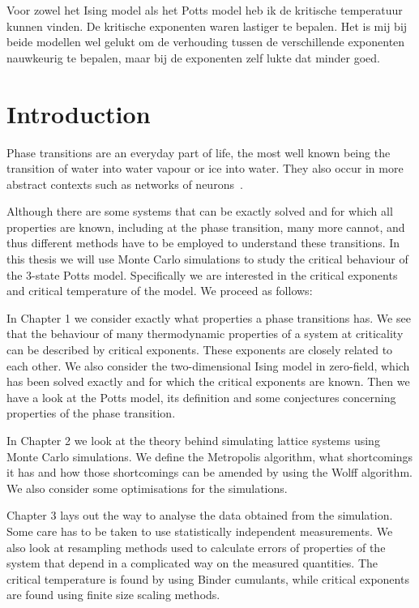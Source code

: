 \documentclass[11pt, a4paper]{report} %
\begin{document}
Voor zowel het Ising model als het Potts model heb ik de kritische temperatuur kunnen vinden.
De kritische exponenten waren lastiger te bepalen.
Het is mij bij beide modellen wel gelukt om de verhouding tussen de verschillende exponenten nauwkeurig te bepalen, maar bij de exponenten zelf lukte dat minder goed.



\tableofcontents

\chapter*{Introduction}
Phase transitions are an everyday part of life, the most well known being the transition of water into water vapour or ice into water.
They also occur in more abstract contexts such as networks of neurons~\cite{tkacik:2015}.

Although there are some systems that can be exactly solved and for which all properties are known, including at the phase transition, many more cannot, and thus different methods have to be employed to understand these transitions.
In this thesis we will use Monte Carlo simulations to study the critical behaviour of the 3-state Potts model.
Specifically we are interested in the critical exponents and critical temperature of the model.
We proceed as follows:

In Chapter 1 we consider exactly what properties a phase transitions has.
We see that the behaviour of many thermodynamic properties of a system at criticality can be described by critical exponents.
These exponents are closely related to each other.
We also consider the two-dimensional Ising model in zero-field, which has been solved exactly and for which the critical exponents are known.
Then we have a look at the Potts model, its definition and some conjectures concerning properties of the phase transition.

In Chapter 2 we look at the theory behind simulating lattice systems using Monte Carlo simulations.
We define the Metropolis algorithm, what shortcomings it has and how those shortcomings can be amended by using the Wolff algorithm.
We also consider some optimisations for the simulations.

Chapter 3 lays out the way to analyse the data obtained from the simulation.
Some care has to be taken to use statistically independent measurements.
We also look at resampling methods used to calculate errors of properties of the system that depend in a complicated way on the measured quantities.
The critical temperature is found by using Binder cumulants, while critical exponents are found using finite size scaling methods.
\end{document}
